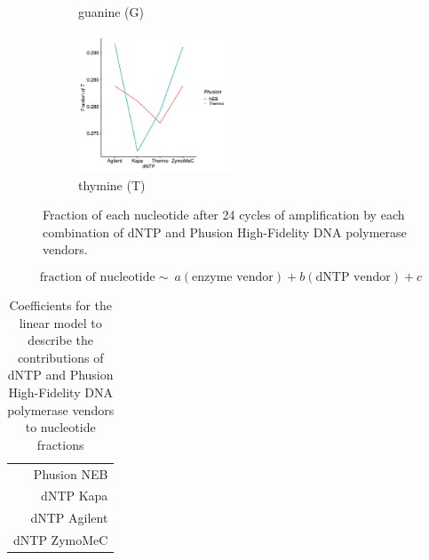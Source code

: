 \documentclass[parskip=full, numbers=noenddot]{scrreprt}
\begin{document}
\begin{figure}[htpb]
\begin{subfigure}[htpb]{0.5\textwidth}
    \caption{guanine (G)}
    \label{fig:linearmodel_g}
  \end{subfigure}
  \begin{subfigure}[htpb]{0.5\textwidth}
    \centering
    \includegraphics[width=0.5\textwidth]{linearmodel_t}
    \caption{thymine (T)}
    \label{fig:linearmodel_t}
  \end{subfigure}
  \caption{Fraction of each nucleotide after 24 cycles of amplification by each combination of dNTP and Phusion High-Fidelity DNA polymerase vendors.}
  \label{fig:linearmodel_nt}
\end{figure}

\begin{equation}
  \label{eqn:linearmodel}
  \textrm{fraction of nucleotide} \sim\ a (\textrm{enzyme vendor}) + b (\textrm{dNTP vendor}) + c
\end{equation}

\begin{table}[htpb]
  \centering
  \begin{tabular}{r}
     \\
    Phusion NEB\\
    dNTP Kapa\\
    dNTP Agilent\\
    dNTP ZymoMeC\\
  \end{tabular}%
  \caption{Coefficients for the linear model to describe the contributions of dNTP and Phusion High-Fidelity DNA polymerase vendors to nucleotide fractions}
  \label{tab:linearmodel_coeffs}
\end{table}
\end{document}

